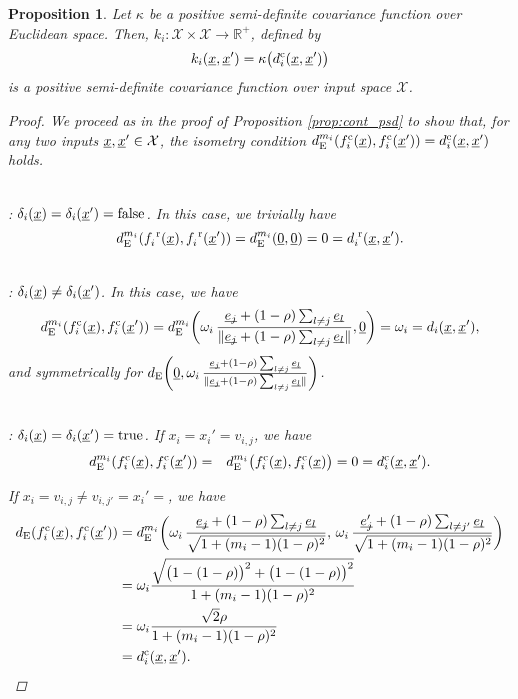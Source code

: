 \documentclass[letterpaper]{article}
\newcommand{\vect}[1]{\underline{\smash{#1}}}
\renewcommand{\v}[1]{\vect{#1}}
\newcommand{\reals}{\mathds{R}}
\newcommand{\sX}{\mathcal{X}}
\newcommand{\br}{^{\text{\textnormal{ r}}}}
\newcommand{\cat}{^{\text{\textnormal{c}}}}
\newtheorem{prop}[thm]{Proposition}
\begin{document}
\begin{prop}
Let $\kappa$ be a positive semi-definite covariance function over Euclidean space.
Then, $k_i\colon \sX \times \sX\to \reals^+$, defined by 
\[k_i(\v{x},\v{x}') = \kappa\bigl( d\cat_i(\v{x}, \v{x}') \bigr)\]
is a positive semi-definite covariance function over input space $\sX$. 
\label{prop:cat_psd}
\begin{proof}
We proceed as in the proof of Proposition \ref{prop:cont_psd} to show that, for any two inputs $\v{x},\v{x}' \in \sX$, the isometry condition $d_{\text{E}}^{m_i}(f\cat_i(\v{x}),f\cat_i(\v{x}')) = d\cat_i(\v{x},\v{x}')$ holds.

~\\: $\delta_i(\v{x}) = \delta_i(\v{x}') = \textrm{false}$.
In this case, we trivially have 
\[d_{\text{E}}^{m_i}(f_i\br(\v{x}),f_i\br(\v{x}')) = d_{\text{E}}^{m_i}(\v{0}, \v{0}) = 0 = d_i\br(\v{x},\v{x}').\]

~\\: $\delta_i(\v{x}) \neq \delta_i(\v{x}')$. In this case, we have
\[d_{\text{E}}^{m_i}(f\cat_i(\v{x}),f\cat_i(\v{x}')) = 
d_{\text{E}}^{m_i}\biggl(\omega_i\,\frac{\v{e_j}+(1-\rho)\sum_{l\neq j} \v{e_l}}
{\|\v{e_j}+(1-\rho)\sum_{l\neq j} \v{e_l}\|}, \v{0}\biggr) 
= \omega_i = d_i(\v{x},\v{x}'),\]
and symmetrically for $d_{\text{E}}\biggl(\v{0}, \omega_i\,\frac{\v{e_j}+(1-\rho)\sum_{l\neq j} \v{e_l}}
{\|\v{e_j}+(1-\rho)\sum_{l\neq j} \v{e_l}\|}\biggr)$.

~\\: $\delta_i(\v{x}) = \delta_i(\v{x}') = \textrm{true}$. 
If $x_i=x_i'=v_{i,j}$, we have 
\begin{eqnarray}
\nonumber{}d_{\text{E}}^{m_i}(f\cat_i(\v{x}),f\cat_i(\v{x}')) & = & d_{\text{E}}^{m_i}\bigl(
f\cat_i(\v{x}),f\cat_i(\v{x})
\bigr) = 0 = d\cat_i(\v{x}, \v{x}').
\end{eqnarray}

\noindent{}If $x_i=v_{i,j} \neq v_{i,j'} = x_i'=$, we have 
\begin{align} 
\nonumber{}d_{\text{E}}(f\cat_i(\v{x}),f\cat_i(\v{x}')) & = 
d_{\text{E}}^{m_i}\biggl(
\omega_i\,\frac{\v{e_j}+(1-\rho)\sum_{l\neq j} \v{e_l}}
{\sqrt{1+(m_i-1)(1-\rho)^2}},\,
\omega_i\,\frac{\v{e_j'}+(1-\rho)\sum_{l\neq j'} \v{e_l}}
{\sqrt{1+(m_i-1)(1-\rho)^2}}
\biggr) \\
& = \omega_i \frac{\sqrt{\bigl(1-(1-\rho)\bigr)^2 + \bigl(1-(1-\rho)\bigr)^2}}
{1+(m_i-1)(1-\rho)^2} \nonumber\\
& = \omega_i \frac{\sqrt{2} \rho}
{1+(m_i-1)(1-\rho)^2} \nonumber\\
& = d\cat_i(\v{x}, \v{x}').
\end{align}
\end{proof}
\end{prop}
\end{document}
